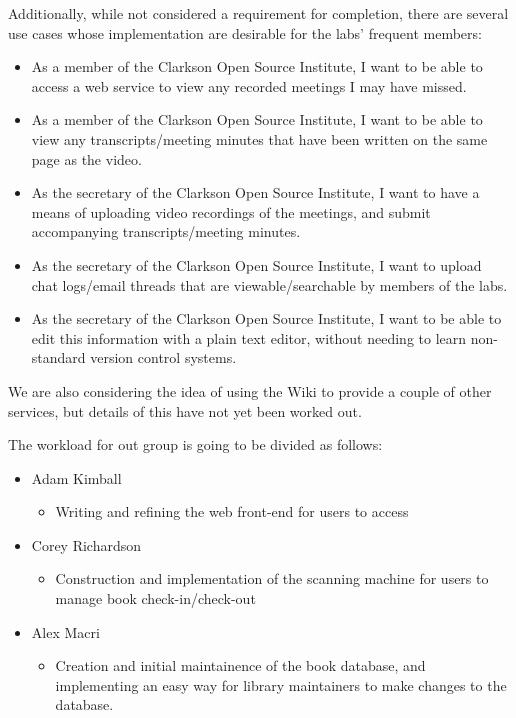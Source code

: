 \documentclass[a4paper, 10pt, oneside, draft]{article}
\begin{document}
Additionally, while not considered a requirement for completion, there are several use cases whose implementation are desirable for the labs' frequent members:

\begin{itemize}
	\item As a member of the Clarkson Open Source Institute, I want to be able to access a web service to view any recorded meetings I may have missed.
	\item As a member of the Clarkson Open Source Institute, I want to be able to view any transcripts/meeting minutes that have been written on the same page as the video.
	\item As the secretary of the Clarkson Open Source Institute, I want to have a means of uploading video recordings of the meetings, and submit accompanying transcripts/meeting minutes.
	\item As the secretary of the Clarkson Open Source Institute, I want to upload chat logs/email threads that are viewable/searchable by members of the labs.
	\item As the secretary of the Clarkson Open Source Institute, I want to be able to edit this information with a plain text editor, without needing to learn non-standard version control systems.

\end{itemize}

We are also considering the idea of using the Wiki to provide a couple of other services, but details of this have not yet been worked out.

The workload for out group is going to be divided as follows:

\begin{itemize}
	\item Adam Kimball
		\begin{itemize}
 			\item Writing and refining the web front-end for users to access
		\end{itemize}
	\item Corey Richardson
		\begin{itemize}
			\item Construction and implementation of the scanning machine for users to manage
				book check-in/check-out
		\end{itemize}
	\item Alex Macri
		\begin{itemize}
			\item Creation and initial maintainence of the book database, and implementing
				an easy way for library maintainers to make changes to the database.
		\end{itemize}
\end{itemize}
\end{document}
